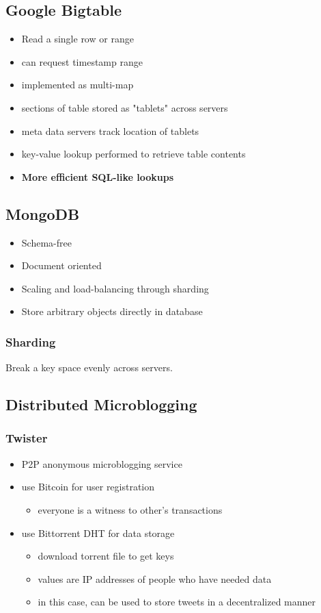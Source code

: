 \documentclass[12pt]{article}
\begin{document}
\subsection{Google Bigtable}
\begin{itemize}
  \item Read a single row or range
  \item can request timestamp range
  \item implemented as multi-map
  \item sections of table stored as "tablets" across servers
  \item meta data servers track location of tablets
  \item key-value lookup performed to retrieve table contents
  \item \textbf{More efficient SQL-like lookups}
\end{itemize}

\subsection{MongoDB}
\begin{itemize}
  \item Schema-free
  \item Document oriented
  \item Scaling and load-balancing through sharding
  \item Store arbitrary objects directly in database
\end{itemize}

\subsubsection{Sharding}
Break a key space evenly across servers.

\subsection{Distributed Microblogging}
\subsubsection{Twister}
\begin{itemize}
  \item P2P anonymous microblogging service
  \item {
    use Bitcoin for user registration
    \begin{itemize}
      \item everyone is a witness to other's transactions
    \end{itemize}
  }
  \item {
    use Bittorrent DHT for data storage
    \begin{itemize}
      \item download torrent file to get keys
      \item values are IP addresses of people who have needed data
      \item in this case, can be used to store tweets in a decentralized manner
    \end{itemize}
  }
\end{itemize}
\end{document}
